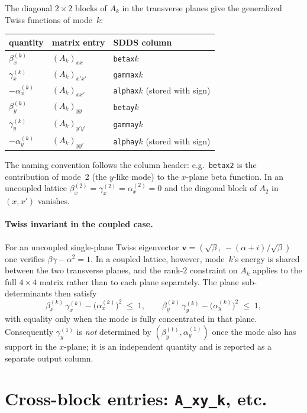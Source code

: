 \documentclass[11pt]{article}
\begin{document}
The diagonal $2\times 2$ blocks of $A_k$ in the transverse planes give the
generalized Twiss functions of mode~$k$:
\begin{center}
\begin{tabular}{l l l}
\hline
quantity & matrix entry & SDDS column \\
\hline
$\beta_x^{(k)}$         & $(A_k)_{xx}$    & \verb|betax|$k$  \\
$\gamma_x^{(k)}$        & $(A_k)_{x'x'}$  & \verb|gammax|$k$ \\
$-\alpha_x^{(k)}$       & $(A_k)_{xx'}$   & \verb|alphax|$k$ (stored with sign) \\
$\beta_y^{(k)}$         & $(A_k)_{yy}$    & \verb|betay|$k$  \\
$\gamma_y^{(k)}$        & $(A_k)_{y'y'}$  & \verb|gammay|$k$ \\
$-\alpha_y^{(k)}$       & $(A_k)_{yy'}$   & \verb|alphay|$k$ (stored with sign) \\
\hline
\end{tabular}
\end{center}
The naming convention follows the column header: e.g.\ \verb|betax2| is
the contribution of mode~2 (the $y$-like mode) to the $x$-plane beta function.
In an uncoupled lattice $\beta_x^{(2)} = \gamma_x^{(2)} = \alpha_x^{(2)} = 0$
and the diagonal block of $A_2$ in $(x,x')$ vanishes.

\paragraph{Twiss invariant in the coupled case.}
For an uncoupled single-plane Twiss eigenvector
$\mathbf{v} = (\sqrt{\beta},\,-(\alpha+i)/\sqrt{\beta})$ one verifies
$\beta\gamma - \alpha^2 = 1$. In a coupled lattice, however, mode~$k$'s
energy is shared between the two transverse planes, and the rank-$2$
constraint on $A_k$ applies to the full $4\times 4$ matrix rather than to
each plane separately. The plane sub-determinants then satisfy
\[
   \beta_x^{(k)}\,\gamma_x^{(k)} - \bigl(\alpha_x^{(k)}\bigr)^2 \;\le\; 1 ,
   \qquad
   \beta_y^{(k)}\,\gamma_y^{(k)} - \bigl(\alpha_y^{(k)}\bigr)^2 \;\le\; 1 ,
\]
with equality only when the mode is fully concentrated in that plane.
Consequently $\gamma_y^{(1)}$ is \emph{not} determined by $(\beta_y^{(1)},
\alpha_y^{(1)})$ once the mode also has support in the $x$-plane; it is an
independent quantity and is reported as a separate output column.

\section{Cross-block entries: \texttt{A\_xy\_k}, etc.}
\end{document}
